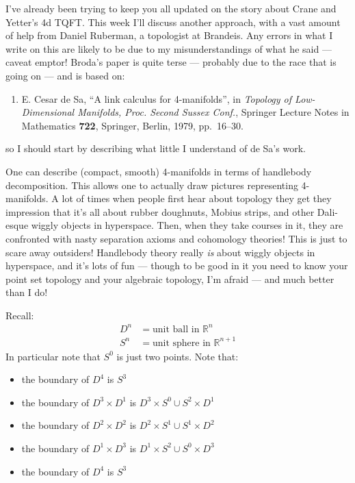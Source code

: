 \documentclass{article}
\def\tightlist{}
\begin{document}
I've already been trying to keep you all updated on the story about
Crane and Yetter's 4d TQFT. This week I'll discuss another approach,
with a vast amount of help from Daniel Ruberman, a topologist at
Brandeis. Any errors in what I write on this are likely to be due to my
misunderstandings of what he said --- caveat emptor! Broda's paper is
quite terse --- probably due to the race that is going on --- and is
based on:

\begin{enumerate}
\def\labelenumi{\arabic{enumi})}
\setcounter{enumi}{2}
\item
E. Cesar de Sa, ``A link calculus for 4-manifolds'', in \emph{Topology
of Low-Dimensional Manifolds, Proc. Second Sussex Conf.}, Springer Lecture
Notes in Mathematics \textbf{722}, Springer, Berlin, 1979, pp.~16--30.
\end{enumerate}
\noindent
so I should start by describing what little I understand of de Sa's
work.

One can describe (compact, smooth) 4-manifolds in terms of handlebody
decomposition. This allows one to actually draw pictures representing
4-manifolds. A lot of times when people first hear about topology they
get they impression that it's all about rubber doughnuts, Mobius strips,
and other Dali-esque wiggly objects in hyperspace. Then, when they take
courses in it, they are confronted with nasty separation axioms and
cohomology theories! This is just to scare away outsiders! Handlebody
theory really \emph{is} about wiggly objects in hyperspace, and it's
lots of fun --- though to be good in it you need to know your point set
topology and your algebraic topology, I'm afraid --- and much better
than I do!

Recall:
\[\begin{aligned}D^n &= \mbox{unit ball in $\mathbb{R}^n$} \\ S^n &= \mbox{unit sphere in $\mathbb{R}^{n+1}$}\end{aligned}\]
In particular note that \(S^0\) is just two points. Note that:

\begin{itemize}
\tightlist
\item
  the boundary of \(D^4\) is \(S^3\)
\item
  the boundary of \(D^3 \times D^1\) is
  \(D^3 \times S^0 \cup S^2 \times D^1\)
\item
  the boundary of \(D^2 \times D^2\) is
  \(D^2 \times S^1 \cup S^1 \times D^2\)
\item
  the boundary of \(D^1 \times D^3\) is
  \(D^1 \times S^2 \cup S^0 \times D^3\)
\item
  the boundary of \(D^4\) is \(S^3\)
\end{itemize}
\end{document}
